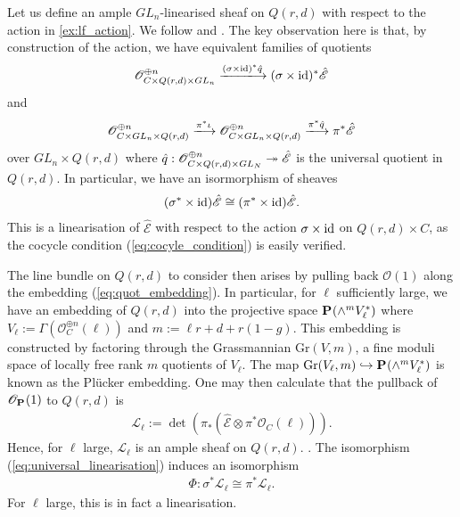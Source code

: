 \documentclass[12pt]{ociamthesis}  %
\begin{document}
\begin{example}
  Let us define an ample $GL_n$-linearised sheaf on
  $Q(r,d)$ with respect to the action in \ref{ex:lf_action}. We follow
  \cite[75-76]{hoskins2016} and \cite[90]{huybrechts2010}.
  The key observation
  here is that, by construction of the action, we have equivalent
  families of quotients
  \begin{align*}
    \mathscr O^{\oplus n}_{C\times Q(r,d)\times GL_n}
    \xlongrightarrow{(\sigma\times\identity)^* \hat q}
    (\sigma\times\identity)^* \hat{\mathscr E}
  \end{align*}
  and
  \begin{align*}
    \mathscr O^{\oplus n}_{C\times GL_n\times Q(r,d)}
    \xlongrightarrow{\pi^*\iota}
    \mathscr O^{\oplus n}_{C\times GL_n\times Q(r,d)}
    \xlongrightarrow{\pi^*\hat q}
    \pi^*\hat{\mathscr E}
  \end{align*}
  over $GL_n\times Q(r,d)$ where
  $\hat q : \mathscr O^{\oplus n}_{C\times Q(r,d)\times GL_N} \twoheadrightarrow \hat{\mathscr E}$
  is the universal quotient in $Q(r,d)$. In particular, we have
  an isormorphism of sheaves
  \begin{align}\label{eq:universal_linearisation}
    (\sigma^*\times\operatorname{id})\hat{\mathscr E} \cong (\pi^*\times\operatorname{id})\hat{\mathscr E}.
  \end{align}
  This is a linearisation of $\hat{\mathscr E}$ with respect to
  the action $\sigma\times\operatorname{id}$ on $Q(r,d)\times C$, as the
  cocycle condition (\ref{eq:cocyle_condition}) is easily verified.

  The line bundle on $Q(r,d)$ to consider then arises
  by pulling back $\mathscr O(1)$ along the embedding (\ref{eq:quot_embedding}).
  In particular, for $\ell$ sufficiently large, we have an
  embedding of $Q(r,d)$ into the projective space
  $\mathbf{P}^{}_{}(\wedge^m V_\ell^*)$
  where $V_\ell:=\Gamma(\mathscr O^{\oplus n}_C(\ell))$ and $m := \ell r+d+r(1-g)$.
  This embedding is constructed by factoring through the Grassmannian
  $\text{Gr}(V,m)$, a fine moduli space of locally free rank $m$ quotients of
  $V_\ell$.  The map $\text{Gr}(V_\ell,m)\hookrightarrow\mathbf{P}^{}_{}(\wedge^m V_\ell^*)$ is known as the Pl\"ucker
  embedding.  One may then calculate that the pullback of $\mathscr
    O_{\mathbf{P}^{}_{}}(1)$ to $Q(r,d)$ is
  \begin{align*}
    \mathscr L_\ell
    := \det(\pi_*(\hat{\mathscr E} \otimes \pi^*\mathscr O_C(\ell))).
  \end{align*}
  Hence, for $\ell$ large, $\mathscr L_\ell$ is an ample sheaf
  on $Q(r,d)$. \cite[Proposition 2.2.5]{huybrechts2010}.
  The isomorphism (\ref{eq:universal_linearisation}) induces an isomorphism
  \begin{align*}
    \Phi:\sigma^*\mathscr L_\ell \cong \pi^*\mathscr L_\ell.
  \end{align*}
  For $\ell$ large, this is in fact a linearisation.
\end{example}
\end{document}
